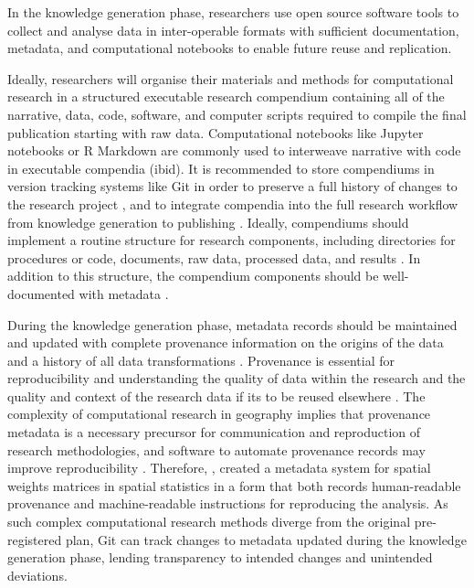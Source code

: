 \documentclass{isprs} %
\begin{document}
In the knowledge generation phase, researchers use open source software tools to collect and analyse data in inter-operable formats with sufficient documentation, metadata, and computational notebooks to enable future reuse and replication.

Ideally, researchers will organise their materials and methods for computational research in a structured executable research compendium \citep{Singleton2016,Nust2021} containing all of the narrative, data, code, software, and computer scripts required to compile the final publication starting with raw data.
Computational notebooks like Jupyter notebooks or R Markdown are commonly used to interweave narrative with code in executable compendia (ibid).
It is recommended to store compendiums in version tracking systems like Git in order to preserve a full history of changes to the research project \citep{Stodden2014}, and to integrate compendia into the full research workflow from knowledge generation to publishing \citep{Kray2019}.
Ideally, compendiums should implement a routine structure for research components, including directories for procedures or code, documents, raw data, processed data, and results \cite{Kedron_Holler_2022,Christensen2019,Marwick2018}.
In addition to this structure, the compendium components should be well-documented with metadata \cite{Kedron_Holler_2022,Marwick2018}.

During the knowledge generation phase, metadata records should be maintained and updated with complete provenance information on the origins of the data and a history of all data transformations \citep{NASEM2019,Tullis2021}.
Provenance is essential for reproducibility \citep{Kedron2021} and understanding the quality of data within the research and the quality and context of the research data if its to be reused elsewhere \citep{Tullis2021,Schuurman2006}.
The complexity of computational research in geography implies that provenance metadata is a necessary precursor for communication and reproduction of research methodologies, and software to automate provenance records may improve reproducibility \citep{Kedron2021}.
Therefore, \citet{Anselin2014}, created a metadata system for spatial weights matrices in spatial statistics in a form that both records human-readable provenance and machine-readable instructions for reproducing the analysis.
As such complex computational research methods diverge from the original pre-registered plan, Git can track changes to metadata updated during the knowledge generation phase, lending transparency to intended changes and unintended deviations.
\end{document}
